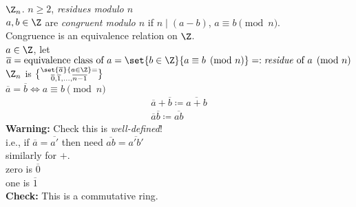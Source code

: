 \ex $\Z_n$. $n\geq2$, \emph{residues modulo $n$} \\
$a,b\in\Z$ are \emph{congruent modulo $n$} if $n\mid(a-b)$, $a\equiv b\pmod n$. \\
Congruence is an equivalence relation on $\Z$. \\
$a\in\Z$, let $\overline a=\text{equivalence class of $a$}=\set{b\in\Z}{a\equiv b\pmod n}=:\text{\emph{residue} of $a\pmod n$}$ \\
$\Z_n$ is $\set{\overline a}{a\in\Z}=\brace{\overline0,\overline1,\dotsc,\overline{n-1}}$ \\
\note $\overline a=\overline b\iff a\equiv b\pmod n$
\begin{align*}
\overline a + \overline b \coloneqq \overline{a+b} \\
\overline a \overline b \coloneqq \overline{ab}
\end{align*}
\textbf{Warning:} Check this is \emph{well-defined}! \\
i.e., if $\overline a=\overline{a'}$ then need $\overline{ab}=\overline{a'b'}$ \\
similarly for $+$. \\
zero is $\overline0$ \\
one is $\overline1$ \\
\textbf{Check:} This is a commutative ring.